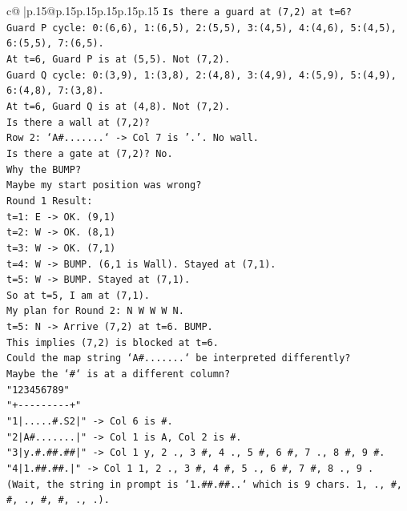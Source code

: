 \documentclass{article}
\begin{document}
{\begin{supertabular}{c@{$\;$}|p{.15\linewidth}@{}p{.15\linewidth}p{.15\linewidth}p{.15\linewidth}p{.15\linewidth}p{.15\linewidth}}
{{{\texttt{Is there a guard at (7,2) at t=6?} \\
\texttt{Guard P cycle: 0:(6,6), 1:(6,5), 2:(5,5), 3:(4,5), 4:(4,6), 5:(4,5), 6:(5,5), 7:(6,5).} \\
\texttt{At t=6, Guard P is at (5,5). Not (7,2).} \\
\texttt{Guard Q cycle: 0:(3,9), 1:(3,8), 2:(4,8), 3:(4,9), 4:(5,9), 5:(4,9), 6:(4,8), 7:(3,8).} \\
\texttt{At t=6, Guard Q is at (4,8). Not (7,2).} \\
\texttt{Is there a wall at (7,2)?} \\
\texttt{Row 2: `A\#.......` {-}> Col 7 is '.'. No wall.} \\
\texttt{Is there a gate at (7,2)? No.} \\
\texttt{Why the BUMP?} \\
\texttt{Maybe my start position was wrong?} \\
\texttt{Round 1 Result:} \\
\texttt{t=1: E {-}> OK. (9,1)} \\
\texttt{t=2: W {-}> OK. (8,1)} \\
\texttt{t=3: W {-}> OK. (7,1)} \\
\texttt{t=4: W {-}> BUMP. (6,1 is Wall). Stayed at (7,1).} \\
\texttt{t=5: W {-}> BUMP. Stayed at (7,1).} \\
\texttt{So at t=5, I am at (7,1).} \\
\texttt{My plan for Round 2: N W W W N.} \\
\texttt{t=5: N {-}> Arrive (7,2) at t=6. BUMP.} \\
\texttt{This implies (7,2) is blocked at t=6.} \\
\texttt{Could the map string `A\#.......` be interpreted differently?} \\
\texttt{Maybe the `\#` is at a different column?} \\
\texttt{"123456789"} \\
\texttt{"+{-}{-}{-}{-}{-}{-}{-}{-}{-}+"} \\
\texttt{"1|.....\#.S2|" {-}> Col 6 is \#.} \\
\texttt{"2|A\#.......|" {-}> Col 1 is A, Col 2 is \#.} \\
\texttt{"3|y.\#.\#\#.\#\#|" {-}> Col 1 y, 2 ., 3 \#, 4 ., 5 \#, 6 \#, 7 ., 8 \#, 9 \#.} \\
\texttt{"4|1.\#\#.\#\#.|" {-}> Col 1 1, 2 ., 3 \#, 4 \#, 5 ., 6 \#, 7 \#, 8 ., 9 . (Wait, the string in prompt is `1.\#\#.\#\#..` which is 9 chars. 1, ., \#, \#, ., \#, \#, ., .).} \\
}}}
\end{supertabular}}
\end{document}
